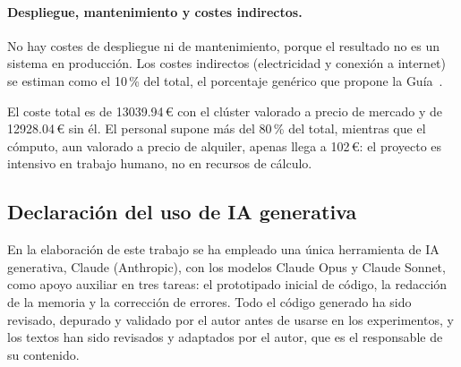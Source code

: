 \paragraph{Despliegue, mantenimiento y costes indirectos.} No hay costes de despliegue ni de mantenimiento, porque el resultado no es un sistema en producción. Los costes indirectos (electricidad y conexión a internet) se estiman como el 10\,\% del total, el porcentaje genérico que propone la Guía~\cite{guiatfg2025}.



El coste total es de \num{13039,94}\,€ con el clúster valorado a precio de mercado y de \num{12928,04}\,€ sin él. El personal supone más del 80\,\% del total, mientras que el cómputo, aun valorado a precio de alquiler, apenas llega a 102\,€: el proyecto es intensivo en trabajo humano, no en recursos de cálculo.

\subsection{Declaración del uso de IA generativa}\label{sec:uso-ia}

En la elaboración de este trabajo se ha empleado una única herramienta de IA generativa, Claude (Anthropic), con los modelos Claude Opus y Claude Sonnet, como apoyo auxiliar en tres tareas: el prototipado inicial de código, la redacción de la memoria y la corrección de errores. Todo el código generado ha sido revisado, depurado y validado por el autor antes de usarse en los experimentos, y los textos han sido revisados y adaptados por el autor, que es el responsable de su contenido.

\endinput
